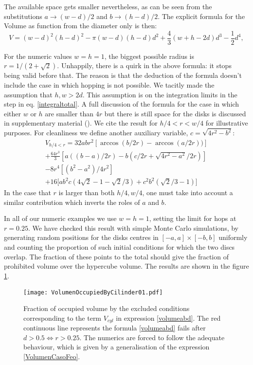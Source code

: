 \documentclass[a4paper,10pt, jcp, aps, preprint]{revtex4-1}
\begin{document}
The available space gets smaller nevertheless, as can be seen from
the substitutions $a\rightarrow (w-d)/2$ and $b\rightarrow (h-d)/2$.
The explicit formula for the Volume as function from the diameter only is then:
\begin{equation}\label{volumewhd}
 V 
= (w-d)^{2} (h-d)^{2}  - 
 \pi (w-d)(h-d) d^{2} + 
\textstyle \frac{4}{3} (w+h-2d) d^{3}  
- \frac{1}{2} d^{4},
\end{equation}
 
For the numeric values $w=h=1$, the biggest possible radius is 
$r=1/(2+\sqrt{2})$. Unhappily, there is a quirk in the above formula:
it stops being valid before that. The reason is that the deduction
of the formula doesn't include the case in which hopping is not possible. 
We tacitly made the assumption that $h,w>2d$.  This assumption is on 
the integration limits in the step in eq. \ref{integraltotal}. 
A full discussion of the formula for the case in which either
$w$ or $h$ are smaller than $4r$ but there is still space for
the disks is discussed in supplementary material \cite{notascalculokarel}
(). 
We cite the  result for $h/4  <r< w/4$ for illustrative purposes.
For cleanliness we define another auxiliary variable,
$c=\sqrt{4r^2-b^2}$:
\begin{multline}\label{VolumenCasoFeo}
V_{h/4<r} = 32abr^2[\arccos(b/2r)-\arccos(a/2r))]\\
+\frac{64 r^3}{3 }[a((b-a)/2r)-b(c/2r+\sqrt{4r^2-a^2}/2r)]\\
-8r^4 [ (b^2-a^2)/4r^2]\\ 
+16[ a b^2 c (4\sqrt{2}-1-\sqrt{2}/3)
+c^2b^2 (\sqrt{2}/3-1) \big]
\end{multline}
In the case that $r$ is larger than both $h/4, w/4$, one must take
into account a similar
contribution which inverts the roles of $a$ and $b$.

In all of our numeric examples we use $w=h=1$, setting the
limit for hops at $r=0.25$. %
We have checked this result with simple Monte Carlo simulations, 
by generating random positions for the disks centres in 
$[-a,a] \times [-b,b]$ uniformly and 
counting the proportion of such initial conditions for 
which the two discs overlap. The fraction of these points to the 
total should give the fraction of prohibited volume over the hypercube
volume. The results are shown in the figure \ref{VolMonteC}.

\begin{figure}[h]
\centering
\texttt{[image: VolumenOccupiedByCilinder01.pdf]}
\caption{Fraction of occupied volume by the excluded conditions
corresponding to the term $V_{cyl}$ in expression \ref{volumeabd}.
 The red continuous line represents the formula \ref{volumeabd} 
 fails after $d>0.5\Leftrightarrow r>0.25$. The numerics
 are forced to follow the adequate behaviour, which is given
by a generalisation of the expression \ref{VolumenCasoFeo}. 
 }\label{VolMonteC}
\end{figure}
\end{document}
